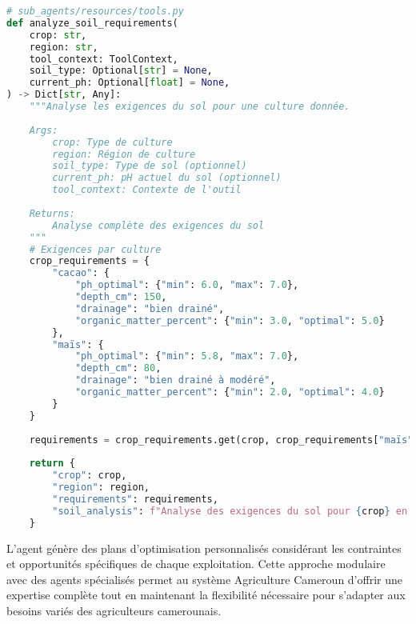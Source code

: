  
\begin{lstlisting}[language=Python, caption=Gestion des ressources]
# sub_agents/resources/tools.py
def analyze_soil_requirements(
    crop: str,
    region: str,
    tool_context: ToolContext,
    soil_type: Optional[str] = None,
    current_ph: Optional[float] = None,
) -> Dict[str, Any]:
    """Analyse les exigences du sol pour une culture donnée.
    
    Args:
        crop: Type de culture
        region: Région de culture
        soil_type: Type de sol (optionnel)
        current_ph: pH actuel du sol (optionnel)
        tool_context: Contexte de l'outil
        
    Returns:
        Analyse complète des exigences du sol
    """
    # Exigences par culture
    crop_requirements = {
        "cacao": {
            "ph_optimal": {"min": 6.0, "max": 7.0},
            "depth_cm": 150,
            "drainage": "bien drainé",
            "organic_matter_percent": {"min": 3.0, "optimal": 5.0}
        },
        "maïs": {
            "ph_optimal": {"min": 5.8, "max": 7.0},
            "depth_cm": 80,
            "drainage": "bien drainé à modéré",
            "organic_matter_percent": {"min": 2.0, "optimal": 4.0}
        }
    }
    
    requirements = crop_requirements.get(crop, crop_requirements["maïs"])
    
    return {
        "crop": crop,
        "region": region,
        "requirements": requirements,
        "soil_analysis": f"Analyse des exigences du sol pour {crop} en région {region}"
    }
\end{lstlisting}

L'agent génère des plans d'optimisation personnalisés considérant les contraintes et opportunités spécifiques de chaque exploitation. Cette approche modulaire avec des agents spécialisés permet au système Agriculture Cameroun d'offrir une expertise complète tout en maintenant la flexibilité nécessaire pour s'adapter aux besoins variés des agriculteurs camerounais.